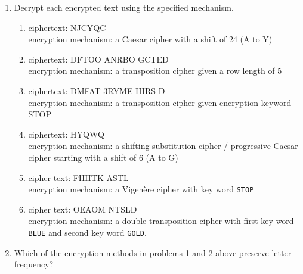 \documentclass[12pt]{article}
\begin{document}
\begin{enumerate}
	\begin{enumerate}
	\item Encrypt the plaintext: RIGHT 10 LEFT 25
	\vspace{1in}
	\item Decrypt the ciphertext: \quad K5OKT \ \  TQXW
	\vspace{1in}
	\end{enumerate}
\newpage
\item Decrypt each encrypted text using the specified mechanism.
	\begin{enumerate}
	\item ciphertext: NJCYQC \\encryption mechanism: a Caesar cipher with a shift of 24 (A to Y)
	\vspace{1in}
	\item ciphertext: DFTOO \;\: ANRBO \;\: GCTED \\encryption mechanism: a transposition cipher given a row length of 5
	\vfill
	\item ciphertext: DMFAT \:\: 3RYME \:\: IIIRS \:\: D \\ encryption mechanism: a transposition cipher given encryption keyword STOP
	\vfill
	\item ciphertext: HYQWQ \\encryption mechanism: a shifting substitution cipher / progressive Caesar cipher starting with a shift of 6 (A to G)
	\vfill
	\newpage
	\item cipher text: FHHTK \:\: ASTL \\encryption mechanism: a Vigen\`{e}re cipher with key word {\tt STOP}
	\vfill
	\item cipher text: OEAOM \:\: NTSLD \\encryption mechanism: a double transposition cipher with first key word {\tt BLUE} and second key word {\tt GOLD}.
	\vfill
	\vfill
	\end{enumerate}
\item Which of the encryption methods in problems 1 and 2 above preserve letter frequency?
\vfill


\end{enumerate}
\end{document}
